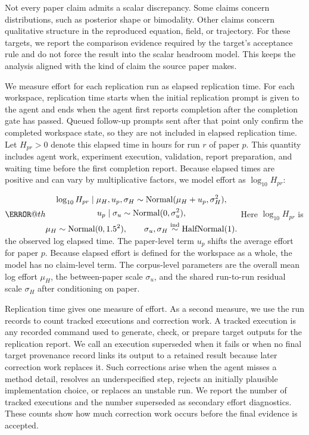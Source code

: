 \documentclass[authoryear,5p,times,nopreprintline]{elsarticle}
\makeatletter
\renewenvironment{equation}%
  {\@beginparpenalty\predisplaypenalty
   \@endparpenalty\postdisplaypenalty
   \refstepcounter{equation}%
   \trivlist\item[]\leavevmode
   \hb@xt@\linewidth\bgroup\hfil$\m@th\displaystyle}%
  {$\hfil\llap{\@eqnnum}\egroup
   \endtrivlist}
\makeatother
\begin{document}
Not every paper claim admits a scalar discrepancy.
Some claims concern distributions, such as posterior shape or bimodality.
Other claims concern qualitative structure in the reproduced equation, field, or trajectory.
For these targets, we report the comparison evidence required by the target's acceptance rule and do not force the result into the scalar headroom model.
This keeps the analysis aligned with the kind of claim the source paper makes.

We measure effort for each replication run as elapsed replication time.
For each workspace, replication time starts when the initial replication prompt is given to the agent and ends when the agent first reports completion after the completion gate has passed.
Queued follow-up prompts sent after that point only confirm the completed workspace state, so they are not included in elapsed replication time.
Let \(H_{pr}>0\) denote this elapsed time in hours for run \(r\) of paper \(p\).
This quantity includes agent work, experiment execution, validation, report preparation, and waiting time before the first completion report.
Because elapsed times are positive and can vary by multiplicative factors, we model effort as \(\log_{10}H_{pr}\):
\begin{equation}
\begin{gathered}
\log_{10} H_{pr}\mid \mu_H,u_p,\sigma_H
\sim \mathrm{Normal}(\mu_H+u_p,\sigma_H^2),\\
u_p\mid\sigma_u \sim \mathrm{Normal}(0,\sigma_u^2),\\
\mu_H \sim \mathrm{Normal}(0,1.5^2), \qquad
\sigma_u,\sigma_H \stackrel{\mathrm{ind}}{\sim}\mathrm{HalfNormal}(1).
\end{gathered}
\label{eq:effort_model}
\end{equation}
Here \(\log_{10}H_{pr}\) is the observed log elapsed time.
The paper-level term \(u_p\) shifts the average effort for paper \(p\).
Because elapsed effort is defined for the workspace as a whole, the model has no claim-level term.
The corpus-level parameters are the overall mean log effort \(\mu_H\), the between-paper scale \(\sigma_u\), and the shared run-to-run residual scale \(\sigma_H\) after conditioning on paper.

Replication time gives one measure of effort.
As a second measure, we use the run records to count tracked executions and correction work.
A tracked execution is any recorded command used to generate, check, or prepare target outputs for the replication report.
We call an execution superseded when it fails or when no final target provenance record links its output to a retained result because later correction work replaces it.
Such corrections arise when the agent misses a method detail, resolves an underspecified step, rejects an initially plausible implementation choice, or replaces an unstable run.
We report the number of tracked executions and the number superseded as secondary effort diagnostics.
These counts show how much correction work occurs before the final evidence is accepted.
\end{document}
